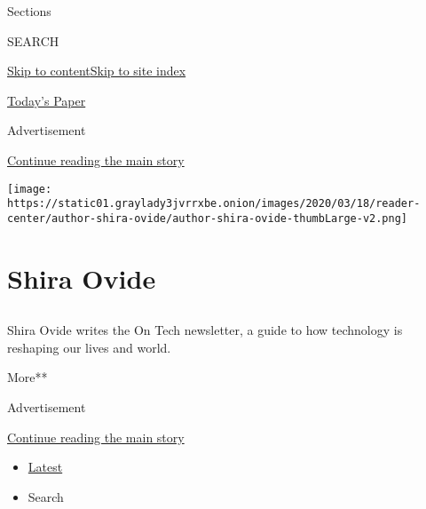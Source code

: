 Sections

SEARCH

\protect\hyperlink{site-content}{Skip to
content}\protect\hyperlink{site-index}{Skip to site index}

\href{https://myaccount.nytimes3xbfgragh.onion/auth/login?response_type=cookie\&client_id=vi}{}

\href{https://www.nytimes3xbfgragh.onion/section/todayspaper}{Today's
Paper}

Advertisement

\protect\hyperlink{after-top}{Continue reading the main story}

\texttt{[image: https://static01.graylady3jvrrxbe.onion/images/2020/03/18/reader-center/author-shira-ovide/author-shira-ovide-thumbLarge-v2.png]}

\hypertarget{shira-ovide}{%
\section{Shira Ovide}\label{shira-ovide}}

\subsection{}

Shira Ovide writes the On Tech newsletter, a guide to how technology is
reshaping our lives and world.

More**

Advertisement

\protect\hyperlink{after-mid1}{Continue reading the main story}

\begin{itemize}
\tightlist
\item
  \protect\hyperlink{stream-panel}{Latest}
\item
  Search
\end{itemize}

